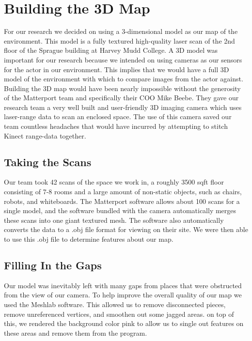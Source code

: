 \documentclass[a4paper,11pt]{article}
\begin{document}
  \section{Building the 3D Map}
  For our research we decided on using a 3-dimensional model as our map of the environment. This model is a fully textured high-quality laser scan of the 2nd floor of the Sprague building at Harvey Mudd College. A 3D model was important for our research because we intended on using cameras as our sensors for the actor in our environment. This implies that we would have a full 3D model of the environment with which to compare  images from the actor against.  Building the 3D map would have been nearly impossible without the generosity of the Matterport team and specifically their COO Mike Beebe. They gave our research team a very well built and user-friendly 3D imaging camera which uses laser-range data to scan an enclosed space. The use of this camera saved our team countless headaches that would have incurred by attempting to stitch Kinect range-data together.
  
  \subsection{Taking the Scans}
 Our team took 42 scans of the space we work in, a roughly 3500 sqft floor consisting of 7-8 rooms and a large amount of non-static objects, such as chairs, robots, and whiteboards. The Matterport software allows about 100 scans for a single model, and the software bundled with the camera automatically merges these scans into one giant textured mesh. The software also automatically converts the data to a .obj file format for viewing on their site. We were then able to use this .obj file to determine features about our map.


  \subsection{Filling In the Gaps}
  Our model was inevitably left with many gaps from places that were obstructed from the view of our camera. To help improve the overall quality of our map we used the Meshlab software. This allowed us to remove disconnected pieces, remove unreferenced vertices, and smoothen out some jagged areas. on top of this, we rendered the background color pink to allow us to single out features on these areas and remove them from the program.
  
\end{document}
